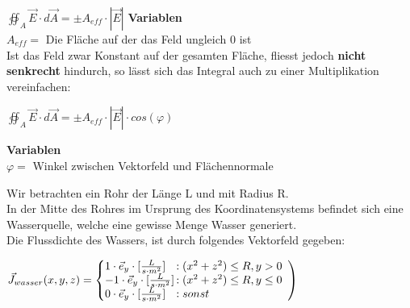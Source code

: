 \formulaBegin
$ \displaystyle \oiint_A \vec{E} \cdot d\vec{A} = \pm A_{eff} \cdot |\vec{E}|$
\formulaEnd
\textbf{Variablen} \\
$A_{eff} =$ Die Fläche auf der das Feld ungleich 0 ist\\


Ist das Feld zwar Konstant auf der gesamten Fläche, fliesst jedoch \textbf{nicht senkrecht} hindurch, so lässt sich das Integral auch zu einer Multiplikation vereinfachen:
\begin{center}
\end{center}
\formulaBegin
$ \displaystyle \oiint_A \vec{E} \cdot d\vec{A} = \pm A_{eff} \cdot |\vec{E}| \cdot cos(\varphi)$
\formulaEnd

\textbf{Variablen} \\
$\varphi =$ Winkel zwischen Vektorfeld und Flächennormale\\
\iend


\newpage


\beginbsp
Wir betrachten ein Rohr der Länge L und mit Radius R. \\
In der Mitte des Rohres im Ursprung des Koordinatensystems befindet sich eine Wasserquelle, welche eine gewisse Menge Wasser generiert. \\
Die Flussdichte des Wassers, ist durch folgendes Vektorfeld gegeben: \\
\begin{center}

	$\displaystyle  \vec{J}_{wasser}(x,y,z) = \left\{
	\begin{array}{@{}l@{\thinspace}l}
		1 \cdot \vec{e}_y  \cdot [\frac{L}{s \cdot m^2}] & :  (x^2 + z^2) \leq R, y > 0 \\
			-1 \cdot \vec{e}_y  \cdot [\frac{L}{s \cdot m^2}] & :  (x^2 + z^2) \leq R, y \leq 0 \\
		0 \cdot \vec{e}_y  \cdot [\frac{L}{s \cdot m^2}] & : sonst                                                   \\
	\end{array}
	\right ) $
\end{center}

